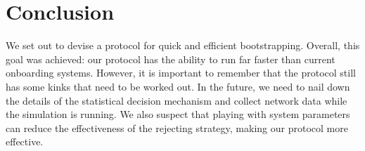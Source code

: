 \section{Conclusion}
\label{sec:conclusion}


We set out to devise a protocol for quick and efficient bootstrapping.
Overall, this goal was achieved: our protocol has the ability to run far faster than current onboarding systems.
However, it is important to remember that the protocol still has some kinks that need to be worked out.
In the future, we need to nail down the details of the statistical decision mechanism and collect network data while the simulation is running.
We also suspect that playing with system parameters can reduce the effectiveness of the rejecting strategy, making our protocol more effective.
